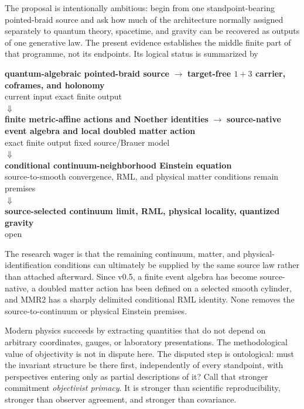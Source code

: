 \documentclass[11pt]{article}
\theoremstyle{definition}
\theoremstyle{remark}
\begin{document}
The proposal is intentionally ambitious: begin from one standpoint-bearing pointed-braid source and ask how much of the architecture normally assigned separately to quantum theory, spacetime, and gravity can be recovered as outputs of one generative law. The present evidence establishes the middle finite part of that programme, not its endpoints. Its logical status is summarized by
\begin{center}
\begin{minipage}{0.96\linewidth}
\centering
\small
\textbf{quantum-algebraic pointed-braid source}
$\longrightarrow$
\textbf{target-free $1+3$ carrier, coframes, and holonomy}\\[-0.15em]
{\footnotesize current input \hspace{16em} exact finite output}\\[0.25em]
$\Downarrow$\\[-0.1em]
\textbf{finite metric-affine actions and Noether identities}
$\longrightarrow$
\textbf{source-native event algebra and local doubled matter action}\\[-0.15em]
{\footnotesize exact finite output \hspace{6em} fixed source/Brauer model}\\[0.25em]
$\Downarrow$\\[-0.1em]
\textbf{conditional continuum-neighborhood Einstein equation}\\[-0.15em]
{\footnotesize source-to-smooth convergence, RML, and physical matter conditions remain premises}\\[0.25em]
$\Downarrow$\\[-0.1em]
\textbf{source-selected continuum limit, RML, physical locality, quantized gravity}\\[-0.15em]
{\footnotesize open}
\end{minipage}
\end{center}
The research wager is that the remaining continuum, matter, and physical-identification conditions can ultimately be supplied by the same source law rather than attached afterward. Since v0.5, a finite event algebra has become source-native, a doubled matter action has been defined on a selected smooth cylinder, and MMR2 has a sharply delimited conditional RML identity. None removes the source-to-continuum or physical Einstein premises.

Modern physics succeeds by extracting quantities that do not depend on arbitrary coordinates, gauges, or laboratory presentations. The methodological value of objectivity is not in dispute here. The disputed step is ontological: must the invariant structure be there first, independently of every standpoint, with perspectives entering only as partial descriptions of it? Call that stronger commitment \emph{objectivist primacy}. It is stronger than scientific reproducibility, stronger than observer agreement, and stronger than covariance.
\end{document}
